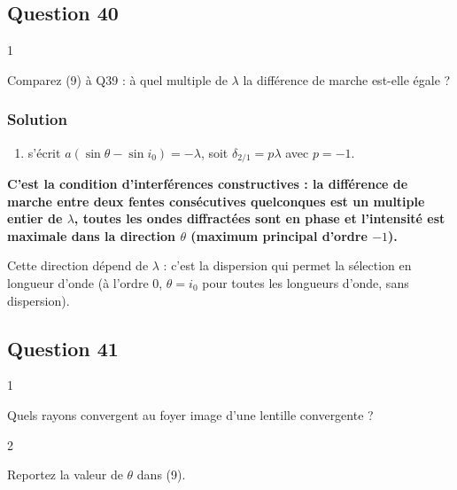 \documentclass[11pt,a4paper]{article}
\providecommand{\tightlist}{\setlength{\itemsep}{0pt}\setlength{\parskip}{0pt}}
\begin{document}
\hypertarget{question-40}{%
\subsection{Question 40}\label{question-40}}

\begin{indication}{1}

Comparez (9) à Q39 : à quel multiple de \(\lambda\) la différence de marche est-elle égale ?

\end{indication}

\hypertarget{solution-39}{%
\subsubsection{Solution}\label{solution-39}}

\begin{enumerate}
\def\labelenumi{(\arabic{enumi})}
\setcounter{enumi}{8}
\tightlist
\item
  s'écrit \(a(\sin\theta - \sin i_0) = -\lambda\), soit \(\delta_{2/1} = p\lambda\) avec \(p = -1\).
\end{enumerate}

\textbf{C'est la condition d'interférences constructives : la différence de marche entre deux fentes consécutives quelconques est un multiple entier de \(\lambda\), toutes les ondes diffractées sont en phase et l'intensité est maximale dans la direction \(\theta\) (maximum principal d'ordre \(-1\)).}

Cette direction dépend de \(\lambda\) : c'est la dispersion qui permet la sélection en longueur d'onde (à l'ordre 0, \(\theta = i_0\) pour toutes les longueurs d'onde, sans dispersion).

\hypertarget{question-41}{%
\subsection{Question 41}\label{question-41}}

\begin{indication}{1}

Quels rayons convergent au foyer image d'une lentille convergente ?

\end{indication}

\begin{indication}{2}

Reportez la valeur de \(\theta\) dans (9).

\end{indication}
\end{document}
